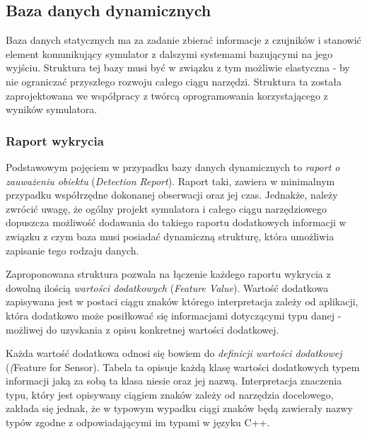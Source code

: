 {\subsection{Baza danych dynamicznych}
\par{
Baza danych statycznych ma za zadanie zbierać informacje z czujników i stanowić element komunikujący symulator z dalszymi systemami bazującymi na jego wyjściu. Struktura tej bazy musi być w związku z tym możliwie elastyczna - by nie ograniczać przyszłego rozwoju całego ciągu narzędzi. Struktura ta została zaprojektowana we współpracy z twórcą oprogramowania korzystającego z wyników symulatora.
}
\subsubsection{Raport wykrycia}
\par{
Podstawowym pojęciem w przypadku bazy danych dynamicznych to \textit{raport o zauważeniu obiektu} (\textit{Detection Report}). Raport taki, zawiera w minimalnym przypadku współrzędne dokonanej obserwacji oraz jej czas. Jednakże, należy zwrócić uwagę, że ogólny projekt symulatora i całego ciągu narzędziowego dopuszcza możliwość dodawania do takiego raportu dodatkowych informacji w związku z czym baza musi posiadać dynamiczną strukturę, która umożliwia zapisanie tego rodzaju danych.
}
\par{
Zaproponowana struktura pozwala na łączenie każdego raportu wykrycia z dowolną ilością \textit{wartości dodatkowych} (\textit{Feature Value}). Wartość dodatkowa  zapisywana jest w postaci ciągu znaków którego interpretacja zależy od aplikacji, która dodatkowo może posiłkować się informacjami dotyczącymi typu danej - możliwej do uzyskania z opisu konkretnej wartości dodatkowej.
}
\par{
Każda wartość dodatkowa odnosi się bowiem do \textit{definicji wartości dodatkowej} (\textit(Feature for Sensor}). Tabela ta opisuje każdą klasę wartości dodatkowych typem informacji jaką za sobą ta klasa niesie oraz jej nazwą. Interpretacja znaczenia typu, który jest opisywany ciągiem znaków zależy od narzędzia docelowego, zakłada się jednak, że w typowym wypadku ciągi znaków będą zawierały nazwy typów zgodne z odpowiadającymi im typami w języku C++.
}
